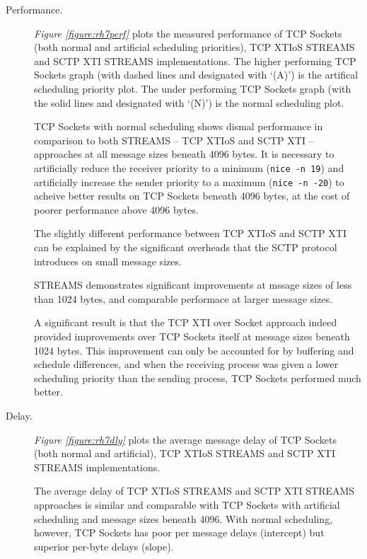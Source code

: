 \documentclass[letterpaper,final,notitlepage,twocolumn,10pt,twoside]{article}
\begin{document}
\begin{description}

\item[Performance.]

\textit{Figure \ref{figure:rh7perf}}
plots the measured performance of TCP Sockets (both normal and artificial scheduling priorities),
TCP XTIoS STREAMS and SCTP XTI STREAMS implementations.
The higher performing TCP Sockets graph (with dashed lines and designated with `(A)') is the
artifical scheduling priority plot.  The under performing TCP Sockets graph (with the solid lines
and designated with `(N)') is the normal scheduling plot.

TCP Sockets with normal scheduling shows dismal performance in comparison to both STREAMS -- TCP
XTIoS and SCTP XTI -- approaches at all message sizes beneath 4096 bytes.  It is necessary to
artificially reduce the receiver priority to a minimum (\texttt{nice -n 19}) and artificially
increase the sender priority to a maximum (\texttt{nice -n -20}) to acheive better results on TCP
Sockets beneath 4096 bytes, at the cost of poorer performance above 4096 bytes.

The slightly different performance between TCP XTIoS and SCTP XTI can be explained by the
significant overheads that the SCTP protocol introduces on small message sizes.

STREAMS demonstrates significant improvements at mssage sizes of less than 1024 bytes, and
comparable performace at larger message sizes.

A significant result is that the TCP XTI over Socket approach indeed provided improvements over TCP
Sockets itself at message sizes beneath 1024 bytes.  This improvement can only be accounted for by
buffering and schedule differences, and when the receiving process was given a lower scheduling
priority than the sending process, TCP Sockets performed much better.

\item[Delay.]

\textit{Figure \ref{figure:rh7dly}}
plots the average message delay of TCP Sockets (both normal and artificial), TCP XTIoS STREAMS and
SCTP XTI STREAMS implementations.

The average delay of TCP XTIoS STREAMS and SCTP XTI STREAMS approaches is similar and comparable
with TCP Sockets with artificial scheduling and message sizes beneath 4096.  With normal scheduling,
however, TCP Sockets has poor per message delays (intercept) but superior per-byte delays (slope).


\end{description}
\end{document}
